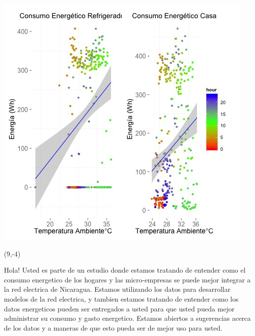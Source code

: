 \documentclass{article}\usepackage[]{graphicx}\usepackage[]{color}
\newenvironment{knitrout}{}{} %
\begin{document}
\begin{knitrout}
\color{fgcolor}
\includegraphics[scale=0.75]{figure/A14_correlaciones} 
\end{knitrout}

 \begin{textblock}{1}(9,-4)
\begin{minipage}{20em}
\begingroup

\endgroup
\end{minipage}
\end{textblock}

\vspace{70px}
\begin{knitrout}
Hola! Usted es parte de un estudio donde estamos tratando de entender como el consumo energetico de los hogares y las micro-empresas se puede mejor integrar a la red electrica de Nicaragua. Estamos utilizando los datos para desarrollar modelos de la red electrica, y tambien estamos tratando de entender como los datos energeticos pueden ser entregados a usted para que usted pueda mejor administrar su consumo y gasto energetico.  Estamos abiertos a sugerencias acerca de los datos y a maneras de que esto pueda ser de mejor uso para usted.
\end{knitrout}
\end{document}
